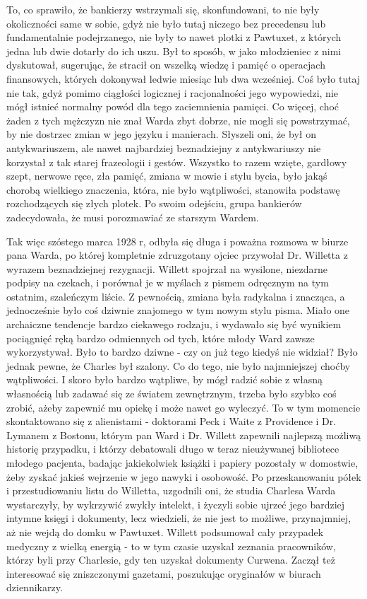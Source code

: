 To, co sprawiło, że bankierzy wstrzymali się, skonfundowani, to nie były okoliczności same w sobie, gdyż nie było tutaj niczego bez precedensu lub fundamentalnie podejrzanego, nie były to nawet plotki z Pawtuxet, z których jedna lub dwie dotarły do ich uszu. Był to sposób, w jako młodzieniec z nimi dyskutował, sugerując, że stracił on wszelką wiedzę i pamięć o operacjach finansowych, których dokonywał ledwie miesiąc lub dwa wcześniej. Coś było tutaj nie tak, gdyż pomimo ciągłości logicznej i racjonalności jego wypowiedzi, nie mógł istnieć normalny powód dla tego zaciemnienia pamięci. Co więcej, choć żaden z tych mężczyzn nie znał Warda zbyt dobrze, nie mogli się powstrzymać, by nie dostrzec zmian w jego języku i manierach. Słyszeli oni, że był on antykwariuszem, ale nawet najbardziej beznadziejny z antykwariuszy nie korzystał z tak starej frazeologii i gestów. Wszystko to razem wzięte, gardłowy szept, nerwowe ręce, zła pamięć, zmiana w mowie i stylu bycia, było jakąś chorobą wielkiego znaczenia, która, nie było wątpliwości, stanowiła podstawę rozchodzących się złych plotek. Po swoim odejściu, grupa bankierów zadecydowała, że musi porozmawiać ze starszym Wardem. 

Tak więc szóstego marca 1928 r, odbyła się długa i poważna rozmowa w biurze pana Warda, po której kompletnie zdruzgotany ojciec przywołał Dr. Willetta z wyrazem beznadziejnej rezygnacji. Willett spojrzał na wysilone, niezdarne podpisy na czekach, i porównał je w myślach z pismem odręcznym na tym ostatnim, szaleńczym liście. Z pewnością, zmiana była radykalna i znacząca, a jednocześnie było coś dziwnie znajomego w tym nowym stylu pisma. Miało one archaiczne tendencje bardzo ciekawego rodzaju, i wydawało się być wynikiem pociągnięć ręką bardzo odmiennych od tych, które młody Ward zawsze wykorzystywał. Było to bardzo dziwne - czy on już tego kiedyś nie widział? Było jednak pewne, że Charles był szalony. Co do tego, nie było najmniejszej choćby wątpliwości. I skoro było bardzo wątpliwe, by mógł radzić sobie z własną własnością lub zadawać się ze światem zewnętrznym, trzeba było szybko coś zrobić, ażeby zapewnić mu opiekę i może nawet go wyleczyć. To w tym momencie skontaktowano się z alienistami - doktorami Peck i Waite z Providence i Dr. Lymanem z Bostonu, którym pan Ward i Dr. Willett zapewnili najlepszą możliwą historię przypadku, i którzy debatowali długo w teraz nieużywanej bibliotece młodego pacjenta, badając jakiekolwiek książki i papiery pozostały w domostwie, żeby zyskać jakieś wejrzenie w jego nawyki i osobowość. Po przeskanowaniu półek i przestudiowaniu listu do Willetta, uzgodnili oni, że studia Charlesa Warda wystarczyły, by wykrzywić zwykły intelekt, i życzyli sobie ujrzeć jego bardziej intymne księgi i dokumenty, lecz wiedzieli, że nie jest to możliwe, przynajmniej, aż nie wejdą do domku w Pawtuxet. Willett podsumował cały przypadek medyczny z wielką energią - to w tym czasie uzyskał zeznania pracowników, którzy byli przy Charlesie, gdy ten uzyskał dokumenty Curwena. Zaczął też interesować się zniszczonymi gazetami, poszukując oryginałów w biurach dziennikarzy.  

